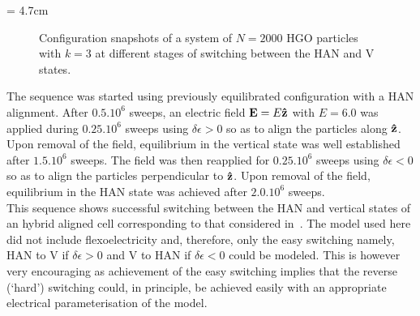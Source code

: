 \picW = 4.7cm
\begin{figure}
	\centering
	\caption{Configuration snapshots of a system of $N=2000$ HGO particles with $k=3$ at
	different stages of switching between the HAN and V states.}
	\label{fig:snaps_HGOHconfSwitch}
\end{figure}

The sequence was started using previously equilibrated configuration with a HAN alignment. After
$0.5.10^6$ sweeps, an electric field $\mathbf{E}=E\mathbf{\hat{z} }$ with $E=6.0$ was applied  during
$0.25.10^6$ sweeps using $\delta\epsilon>0$ so as to align the particles along $\mathbf{\hat{z} }$. Upon
removal of the field, equilibrium in the vertical state was well established after $1.5.10^6$
sweeps. The field was then reapplied for $0.25.10^6$ sweeps using $\delta\epsilon<0$ so as to
align the particles perpendicular to $\mathbf{\hat{z} }$. Upon removal of the field, equilibrium in the
HAN state was achieved after $2.0.10^6$ sweeps.\\

This sequence shows successful switching between the HAN and vertical states of an hybrid
aligned cell corresponding to that considered in~\cite{DavidsonMottram02}. The model used here
did not include flexoelectricity and, therefore, only the easy switching namely, HAN to V if
$\delta\epsilon>0$ and V to HAN if $\delta\epsilon<0$ could be modeled. This is however very
encouraging as achievement of the easy switching implies that the reverse (`hard') switching
could, in principle, be achieved easily with an appropriate electrical parameterisation of the
model.









